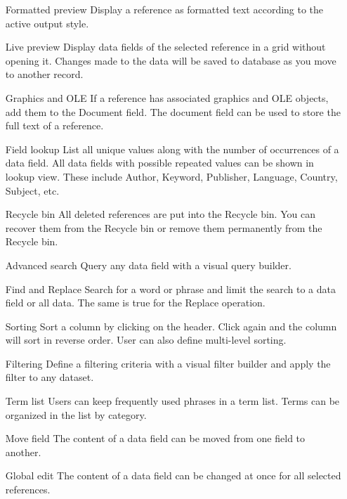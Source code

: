 \begin{itemize}
 \item[Formatted preview] Display a reference as formatted text
 according to the active output style. 

 \item[Live preview] Display data fields of the selected reference in a grid
 without opening it. Changes made to the data will be saved to
 database as you move to another record.

 \item[Graphics and OLE] If a reference has associated graphics and OLE
 objects, add them to the Document field. The document field can
 be used to store the full text of a reference.

 \item[Field lookup] List all unique values along with the number of
 occurrences of a data field. All data fields with possible repeated
 values can be shown in lookup view. These include Author,
 Keyword, Publisher, Language, Country, Subject, etc.

 \item[Recycle bin] All deleted references are put into the Recycle bin.
 You can recover them from the Recycle bin or remove them
 permanently from the Recycle bin.

 \item[Advanced search] Query any data field with a visual query builder.

 \item[Find and Replace] Search for a word or phrase and limit the search
 to a data field or all data. The same is true for the Replace
 operation.

 \item[Sorting] Sort a column by clicking on the header. Click again and
 the column will sort in reverse order. User can also define
 multi-level sorting.

 \item[Filtering] Define a filtering criteria with a visual filter builder and
 apply the filter to any dataset.

 \item[Term list] Users can keep frequently used phrases in a term list.
 Terms can be organized in the list by category.

 \item[Move field] The content of a data field can be moved from one
 field to another.

 \item[Global edit] The content of a data field can be changed at once
 for all selected references.


\end{itemize}
